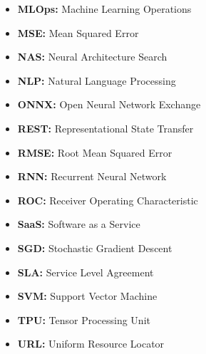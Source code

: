 \begin{itemize}
    \item \textbf{MLOps:} Machine Learning Operations
    \item \textbf{MSE:} Mean Squared Error
    \item \textbf{NAS:} Neural Architecture Search
    \item \textbf{NLP:} Natural Language Processing
    \item \textbf{ONNX:} Open Neural Network Exchange
    \item \textbf{REST:} Representational State Transfer
    \item \textbf{RMSE:} Root Mean Squared Error
    \item \textbf{RNN:} Recurrent Neural Network
    \item \textbf{ROC:} Receiver Operating Characteristic
    \item \textbf{SaaS:} Software as a Service
    \item \textbf{SGD:} Stochastic Gradient Descent
    \item \textbf{SLA:} Service Level Agreement
    \item \textbf{SVM:} Support Vector Machine
    \item \textbf{TPU:} Tensor Processing Unit
    \item \textbf{URL:} Uniform Resource Locator
\end{itemize}
